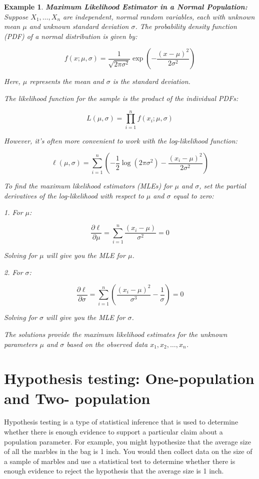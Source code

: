 \documentclass[12pt,a4paper]{article}
\theoremstyle{example}
\newtheorem{example}{Example}
\theoremstyle{definition}
\theoremstyle{theorem}
\begin{document}
\begin{example}
    \textbf{Maximum Likelihood Estimator in a Normal Population:}
Suppose $X_1, \ldots, X_n$ are independent, normal random variables, each with unknown mean $\mu$ and unknown standard deviation $\sigma$. The probability density function (PDF) of a normal distribution is given by:

\[ f(x; \mu, \sigma) = \frac{1}{\sqrt{2\pi\sigma^2}} \exp\left(-\frac{(x - \mu)^2}{2\sigma^2}\right) \]

Here, $\mu$ represents the mean and $\sigma$ is the standard deviation.

The likelihood function for the sample is the product of the individual PDFs:

\[ L(\mu, \sigma) = \prod_{i=1}^{n} f(x_i; \mu, \sigma) \]

However, it's often more convenient to work with the log-likelihood function:

\[ \ell(\mu, \sigma) = \sum_{i=1}^{n} \left(-\frac{1}{2}\log(2\pi\sigma^2) - \frac{(x_i - \mu)^2}{2\sigma^2}\right) \]

To find the maximum likelihood estimators (MLEs) for $\mu$ and $\sigma$, set the partial derivatives of the log-likelihood with respect to $\mu$ and $\sigma$ equal to zero:

1. For $\mu$:

\[ \frac{\partial \ell}{\partial \mu} = \sum_{i=1}^{n} \frac{(x_i - \mu)}{\sigma^2} = 0 \]

Solving for $\mu$ will give you the MLE for $\mu$.

2. For $\sigma$:

\[ \frac{\partial \ell}{\partial \sigma} = \sum_{i=1}^{n} \left(\frac{(x_i - \mu)^2}{\sigma^3} - \frac{1}{\sigma}\right) = 0 \]

Solving for $\sigma$ will give you the MLE for $\sigma$.

The solutions provide the maximum likelihood estimates for the unknown parameters $\mu$ and $\sigma$ based on the observed data $x_1, x_2, \ldots, x_n$.

\end{example}
\section{Hypothesis testing: One-population and Two- population}
Hypothesis testing is a type of statistical inference that is used to determine whether there is enough evidence to support a particular claim about a population parameter. For example, you might hypothesize that the average size of all the marbles in the bag is 1 inch. You would then collect data on the size of a sample of marbles and use a statistical test to determine whether there is enough evidence to reject the hypothesis that the average size is 1 inch.
\end{document}
